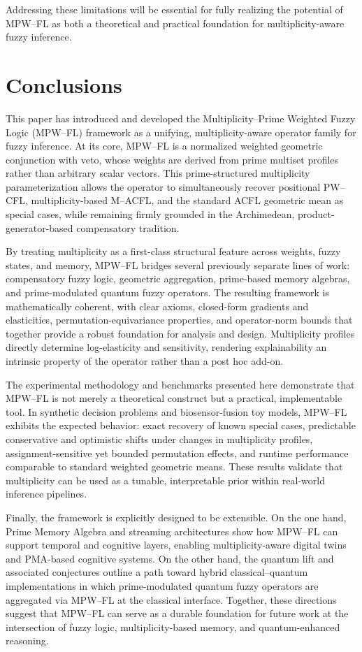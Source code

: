 \documentclass[11pt]{article}
\begin{document}
Addressing these limitations will be essential for fully realizing the potential of MPW--FL as both a theoretical and practical foundation for multiplicity-aware fuzzy inference.

\section{Conclusions}
\label{sec:conclusions}

This paper has introduced and developed the Multiplicity--Prime Weighted Fuzzy Logic (MPW--FL) framework as a unifying, multiplicity-aware operator family for fuzzy inference. At its core, MPW--FL is a normalized weighted geometric conjunction with veto, whose weights are derived from prime multiset profiles rather than arbitrary scalar vectors. This prime-structured multiplicity parameterization allows the operator to simultaneously recover positional PW--CFL, multiplicity-based M--ACFL, and the standard ACFL geometric mean as special cases, while remaining firmly grounded in the Archimedean, product-generator-based compensatory tradition.

By treating multiplicity as a first-class structural feature across weights, fuzzy states, and memory, MPW--FL bridges several previously separate lines of work: compensatory fuzzy logic, geometric aggregation, prime-based memory algebras, and prime-modulated quantum fuzzy operators. The resulting framework is mathematically coherent, with clear axioms, closed-form gradients and elasticities, permutation-equivariance properties, and operator-norm bounds that together provide a robust foundation for analysis and design. Multiplicity profiles directly determine log-elasticity and sensitivity, rendering explainability an intrinsic property of the operator rather than a post hoc add-on.

The experimental methodology and benchmarks presented here demonstrate that MPW--FL is not merely a theoretical construct but a practical, implementable tool. In synthetic decision problems and biosensor-fusion toy models, MPW--FL exhibits the expected behavior: exact recovery of known special cases, predictable conservative and optimistic shifts under changes in multiplicity profiles, assignment-sensitive yet bounded permutation effects, and runtime performance comparable to standard weighted geometric means. These results validate that multiplicity can be used as a tunable, interpretable prior within real-world inference pipelines.

Finally, the framework is explicitly designed to be extensible. On the one hand, Prime Memory Algebra and streaming architectures show how MPW--FL can support temporal and cognitive layers, enabling multiplicity-aware digital twins and PMA-based cognitive systems. On the other hand, the quantum lift and associated conjectures outline a path toward hybrid classical--quantum implementations in which prime-modulated quantum fuzzy operators are aggregated via MPW--FL at the classical interface. Together, these directions suggest that MPW--FL can serve as a durable foundation for future work at the intersection of fuzzy logic, multiplicity-based memory, and quantum-enhanced reasoning.
\end{document}
